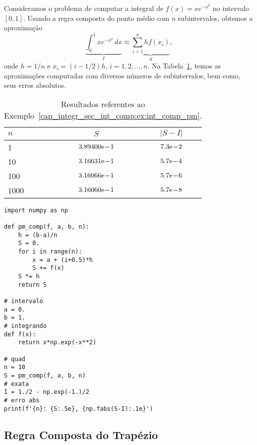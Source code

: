 \begin{ex}\label{cap_integr_sec_int_comp:ex:int_comp_pm}
  Consideramos o problema de computar a integral de $f(x)=xe^{-x^2}$ no intervalo $[0, 1]$. Usando a regra composta do ponto médio com $n$ subintervalos, obtemos a aproximação
  \begin{equation}
    \underbrace{\int_0^1 xe^{-x^2}\,dx}_{I} \approx \underbrace{\sum_{i=1}^n hf(x_i)}_{S},
  \end{equation}
onde $h=1/n$ e $x_i = (i-1/2)h$, $i=1, 2, \dotsc, n$. Na Tabela~\ref{cap_integr_sec_int_comp:tab:ex_int_comp_pm}, temos as aproximações computadas com diversos números de subintervalos, bem como, seus erros absolutos.

\begin{table}[H]
  \centering
  \caption{Resultados referentes ao Exemplo~\ref{cap_integr_sec_int_comp:ex:int_comp_pm}.}
  \begin{tabular}{l|cc}\toprule
    $n$ & $S$ & $|S-I|$ \\\midrule
    1   & $3.89400\mathrm{e}\!-\!1$ & $7.3\mathrm{e}\!-\!2$ \\
    10  & $3.16631\mathrm{e}\!-\!1$ & $5.7\mathrm{e}\!-\!4$ \\
    100 & $3.16066\mathrm{e}\!-\!1$ & $5.7\mathrm{e}\!-\!6$ \\
    1000& $3.16060\mathrm{e}\!-\!1$ & $5.7\mathrm{e}\!-\!8$ \\\bottomrule
  \end{tabular}
  \label{cap_integr_sec_int_comp:tab:ex_int_comp_pm}
\end{table}

\begin{lstlisting}[caption=pm\_comp.py]
import numpy as np

def pm_comp(f, a, b, n):
    h = (b-a)/n
    S = 0.
    for i in range(n):
        x = a + (i+0.5)*h
        S += f(x)
    S *= h
    return S

# intervalo
a = 0.
b = 1.
# integrando
def f(x):
    return x*np.exp(-x**2)

# quad
n = 10
S = pm_comp(f, a, b, n)
# exata
I = 1./2 - np.exp(-1.)/2
# erro abs
print(f'{n}: {S:.5e}, {np.fabs(S-I):.1e}')
\end{lstlisting}
\end{ex}

\subsection{Regra Composta do Trapézio}

